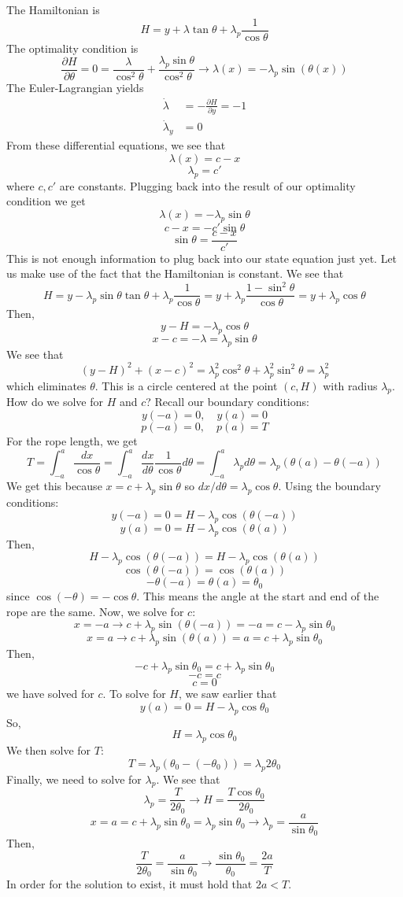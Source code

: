 \documentclass{article}
\begin{document}
\noindent
The Hamiltonian is
\[H = y + \lambda\tan\theta + \lambda_p\frac{1}{\cos\theta}\]
The optimality condition is
\[\frac{\partial H}{\partial \theta} = 0 = \frac{\lambda}{\cos^2\theta}
+ \frac{\lambda_p\sin\theta}{\cos^2\theta} \rightarrow \lambda(x) = -\lambda_p\sin(\theta(x))\]
The Euler-Lagrangian yields
\begin{align*}
    \dot{\lambda} &= -\frac{\partial H}{\partial y} = -1 \\
    \dot{\lambda}_y &= 0
\end{align*}
From these differential equations, we see that
\[\lambda(x) = c - x\]
\[\lambda_p = c'\]
where $c, c'$ are constants. Plugging back into the result of our optimality condition we get
\[\lambda(x) = -\lambda_p\sin\theta\]
\[c - x = -c'\sin\theta\]
\[\sin\theta = \frac{c-x}{c'}\]
This is not enough information to plug back into our state equation just yet. Let us
make use of the fact that the Hamiltonian is constant. We see that
\[H = y - \lambda_p\sin\theta\tan\theta + \lambda_p\frac{1}{\cos\theta}
= y + \lambda_p\frac{1-\sin^2\theta}{\cos\theta} = y + \lambda_p\cos\theta\]
Then,
\[y - H  = -\lambda_p\cos\theta\]
\[x - c =  -\lambda = \lambda_p\sin\theta\]
We see that
\[(y-H)^2 + (x-c)^2 = \lambda_p^2\cos^2\theta + \lambda_p^2\sin^2\theta = \lambda_p^2\]
which eliminates $\theta$. This is a circle centered at the point $(c, H)$ with radius $\lambda_p$.
How do we solve for $H$ and $c$? Recall our boundary conditions:
\[y(-a) = 0, \quad y(a) = 0\]
\[p(-a) = 0, \quad p(a) = T\]
For the rope length, we get
\[T = \int_{-a}^{a}\frac{dx}{\cos\theta} = \int_{-a}^{a}\frac{dx}{d\theta}\frac{1}{\cos\theta}d\theta
= \int_{-a}^{a}\lambda_p d\theta = \lambda_p(\theta(a)-\theta(-a))\]
We get this because $x = c + \lambda_p\sin\theta$ so $dx/d\theta = \lambda_p\cos\theta$.
Using the boundary conditions:
\[y(-a) = 0 = H - \lambda_p\cos(\theta(-a))\]
\[y(a) = 0 = H - \lambda_p\cos(\theta(a))\]
Then,
\[H - \lambda_p\cos(\theta(-a)) = H - \lambda_p\cos(\theta(a))\]
\[\cos(\theta(-a)) = \cos(\theta(a))\]
\[-\theta(-a) = \theta(a) = \theta_0\]
since $\cos(-\theta) = -\cos\theta$. This means the angle at the start and end of the rope
are the same. Now, we solve for $c$:
\[x = -a \rightarrow c + \lambda_p\sin(\theta(-a)) = -a = c - \lambda_p\sin\theta_0\]
\[x = a \rightarrow c + \lambda_p\sin(\theta(a)) = a = c + \lambda_p\sin\theta_0\]
Then,
\[-c + \lambda_p\sin\theta_0 = c + \lambda_p\sin\theta_0\]
\[-c = c\]
\[c = 0\]
we have solved for $c$. To solve for $H$, we saw earlier that
\[y(a) = 0 = H - \lambda_p\cos\theta_0\]
So,
\[H = \lambda_p\cos\theta_0\]
We then solve for $T$:
\[T = \lambda_p(\theta_0 - (-\theta_0)) = \lambda_p 2\theta_0\]
Finally, we need to solve for $\lambda_p$. We see that
\[\lambda_p = \frac{T}{2\theta_0} \rightarrow H = \frac{T\cos\theta_0}{2\theta_0}\]
\[x = a = c + \lambda_p\sin\theta_0 = \lambda_p\sin\theta_0 \rightarrow \lambda_p
= \frac{a}{\sin\theta_0}\]
Then,
\[\frac{T}{2\theta_0} = \frac{a}{\sin\theta_0} \rightarrow
\frac{\sin\theta_0}{\theta_0} = \frac{2a}{T}\]
In order for the solution to exist, it must hold that $2a < T$.
\end{document}
